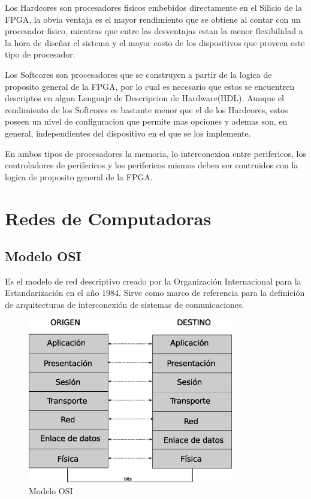 Los Hardcores son procesadores fisicos embebidos directamente en el Silicio de la FPGA, la obvia ventaja es el mayor rendimiento que se obtiene al contar con un procesador fisico, mientras que entre las desventajas estan la menor flexibilidad a la hora de diseñar el sistema y el mayor costo de los dispositivos que proveen este tipo de procesador.

Los Softcores son procesadores que se construyen a partir de la logica de proposito general de la FPGA, por lo cual es necesario que estos se encuentren descriptos en algun Lenguaje de Descripcion de Hardware(HDL). Aunque el rendimiento de los Softcores es bastante menor que el de los Hardcores, estos poseen un nivel de configuracion que permite mas opciones y ademas son, en general, independientes del dispositivo en el que se los implemente.

En ambos tipos de procesadores la memoria, lo interconexion entre perifericos, los controladores de perifericos y los perifericos mismos deben ser contruidos con la logica de proposito general de la FPGA.


\section{Redes de Computadoras}

\subsection{Modelo OSI}

Es el modelo de red descriptivo creado por la Organización Internacional para la Estandarización en el año 1984. Sirve como marco de referencia para la definición de arquitecturas de interconexión de sistemas de comunicaciones.

\begin{figure}[h]
  \centering
	\includegraphics[width=0.80\textwidth]{2-sistema/graf/osi.eps}
  \caption{Modelo OSI}
  \label{fig:osi}
\end{figure}

